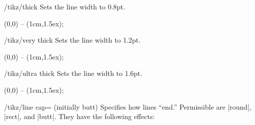 \begin{stylekey}{/tikz/thick}
  Sets the line width to 0.8pt.
\begin{codeexample}[]
  \tikz \draw[thick] (0,0) -- (1cm,1.5ex);
\end{codeexample}
\end{stylekey}

\begin{stylekey}{/tikz/very thick}
  Sets the line width to 1.2pt.
\begin{codeexample}[]
  \tikz {} (0,0) -- (1cm,1.5ex);
\end{codeexample}
\end{stylekey}

\begin{stylekey}{/tikz/ultra thick}
  Sets the line width to 1.6pt.
\begin{codeexample}[]
  \tikz {} (0,0) -- (1cm,1.5ex);
\end{codeexample}
\end{stylekey}


\begin{key}{/tikz/line cap= (initially butt)}
  Specifies how lines ``end.'' Permissible  are |round|,
  |rect|, and |butt|. They have the following effects:

\begin{codeexample}[]
\end{codeexample}
\end{key}

